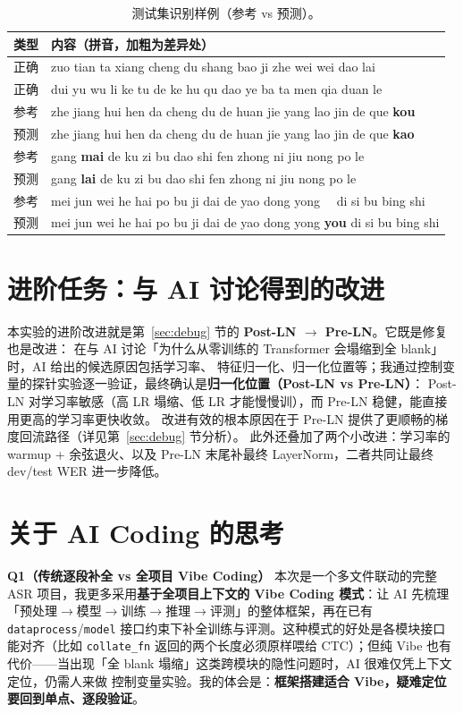 \documentclass[a4paper]{article}
\begin{document}
\begin{table}[H]
  \centering
  \small
  \begin{tabularx}{\textwidth}{l X}
  \toprule
  类型 & 内容（拼音，加粗为差异处） \\
  \midrule
  正确 & zuo tian ta xiang cheng du shang bao ji zhe wei wei dao lai \\
  正确 & dui yu wu li ke tu de ke hu qu dao ye ba ta men qia duan le \\
  \midrule
  参考 & zhe jiang hui hen da cheng du de huan jie yang lao jin de que \textbf{kou} \\
  预测 & zhe jiang hui hen da cheng du de huan jie yang lao jin de que \textbf{kao} \\
  \midrule
  参考 & gang \textbf{mai} de ku zi bu dao shi fen zhong ni jiu nong po le \\
  预测 & gang \textbf{lai} de ku zi bu dao shi fen zhong ni jiu nong po le \\
  \midrule
  参考 & mei jun wei he hai po bu ji dai de yao dong yong \ \ di si bu bing shi \\
  预测 & mei jun wei he hai po bu ji dai de yao dong yong \textbf{you} di si bu bing shi \\
  \bottomrule
  \end{tabularx}
  \caption{测试集识别样例（参考 vs 预测）。}
  \label{tab:examples}
\end{table}

\section{进阶任务：与 AI 讨论得到的改进}
本实验的进阶改进就是第~\ref{sec:debug} 节的 \textbf{Post-LN $\rightarrow$ Pre-LN}。它既是修复也是改进：
在与 AI 讨论「为什么从零训练的 Transformer 会塌缩到全 blank」时，AI 给出的候选原因包括学习率、
特征归一化、归一化位置等；我通过控制变量的探针实验逐一验证，最终确认是\textbf{归一化位置（Post-LN vs Pre-LN）}：
Post-LN 对学习率敏感（高 LR 塌缩、低 LR 才能慢慢训），而 Pre-LN 稳健，能直接用更高的学习率更快收敛。
改进有效的根本原因在于 Pre-LN 提供了更顺畅的梯度回流路径（详见第~\ref{sec:debug} 节分析）。
此外还叠加了两个小改进：学习率的 warmup + 余弦退火、以及 Pre-LN 末尾补最终 LayerNorm，二者共同让最终
dev/test WER 进一步降低。

\section{关于 AI Coding 的思考}
\textbf{Q1（传统逐段补全 vs 全项目 Vibe Coding）}\quad
本次是一个多文件联动的完整 ASR 项目，我更多采用\textbf{基于全项目上下文的 Vibe Coding 模式}：让 AI 先梳理
「预处理$\rightarrow$模型$\rightarrow$训练$\rightarrow$推理$\rightarrow$评测」的整体框架，再在已有 \texttt{dataprocess}/\texttt{model}
接口约束下补全训练与评测。这种模式的好处是各模块接口能对齐（比如 \texttt{collate\_fn} 返回的两个长度必须原样喂给
CTC）；但纯 Vibe 也有代价——当出现「全 blank 塌缩」这类跨模块的隐性问题时，AI 很难仅凭上下文定位，仍需人来做
控制变量实验。我的体会是：\textbf{框架搭建适合 Vibe，疑难定位要回到单点、逐段验证}。
\end{document}
